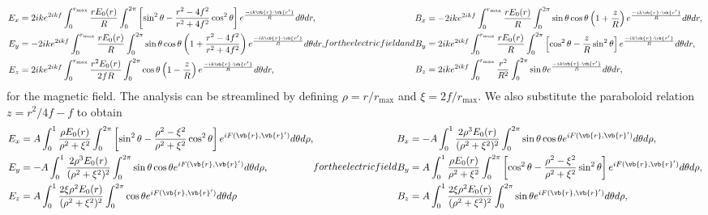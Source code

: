 \documentclass[11pt,SymmetricalJury]{inrsthesis/inrsthesis}
\begin{document}
  \begin{subequations}
  \begin{align}
    E_x      &= 2ike^{2ikf}\int_0^{r_\text{max}}\frac{rE_0(r)}{R}\int_0^{2\pi}
        \left[\sin^2\theta-\frac{r^2-4f^2}{r^2+4f^2}\cos^2\theta\right]
        e^{\frac{-ik\vb{r}\cdot\vb{r'}}{R}} d\theta dr, \\
    E_y     &= -2ike^{2ikf}\int_0^{r_\text{max}}\frac{rE_0(r)}{R}\int_0^{2\pi}
        \sin\theta\cos\theta\left(1+\frac{r^2-4f^2}{r^2+4f^2}\right)
        e^{\frac{-ik\vb{r}\cdot\vb{r'}}{R}} d\theta dr, \\
    E_z     &= 2ike^{2ikf}\int_0^{r_\text{max}}\frac{r^2E_0(r)}{2fR}\int_0^{2\pi}
        \cos\theta\left(1-\frac{z}{R}\right)
        e^{\frac{-ik\vb{r}\cdot\vb{r'}}{R}} d\theta dr,
  \end{align}
for the electric field and
  \begin{align}
    B_x       &=-2ike^{2ikf}\int_0^{r_\text{max}}\frac{rE_0(r)}{R}\int_0^{2\pi}
        \sin\theta\cos\theta\left(1+\frac{z}{R}\right)
        e^{\frac{-ik\vb{r}\cdot\vb{r'}}{R}} d\theta dr, \\
    B_y       &= 2ike^{2ikf}\int_0^{r_\text{max}}\frac{rE_0(r)}{R}\int_0^{2\pi}
        \left[\cos^2\theta-\frac{z}{R}\sin^2\theta\right]
        e^{\frac{-ik\vb{r}\cdot\vb{r'}}{R}} d\theta dr,\\
    B_z       &= 2ike^{2ikf}\int_0^{r_\text{max}}\frac{r^2}{R^2}\int_0^{2\pi}
        \sin\theta e^{\frac{-ik\vb{r}\cdot\vb{r'}}{R}} d\theta dr,
  \end{align}
  \end{subequations}
for the magnetic field. The analysis can be streamlined by defining $\rho=r/r_\text{max}$
and $\xi=2f/r_\text{max}$. We also substitute the paraboloid relation $z=r^2/4f-f$
to obtain
  \begin{subequations}
  \begin{align}
    E_x      &= A\int_0^{1}\frac{\rho E_0(r)}{\rho^2+\xi^2}\int_0^{2\pi}
        \left[\sin^2\theta-\frac{\rho^2-\xi^2}{\rho^2+\xi^2}\cos^2\theta\right]
        e^{iF(\vb{r},\vb{r}')}d\theta d\rho, \\
    E_y     &= -A\int_0^{1}\frac{2\rho^3 E_0(r)}{(\rho^2+\xi^2)^2}\int_0^{2\pi}
        \sin\theta\cos\theta
        e^{iF(\vb{r},\vb{r}')}d\theta d\rho, \\
    E_z     &= A\int_0^{1}\frac{2\xi\rho^2E_0(r)}{(\rho^2+\xi^2)^2}\int_0^{2\pi}
        \cos\theta e^{iF(\vb{r},\vb{r}')}d\theta d\rho
  \end{align}
for the electric field
  \begin{align}
    B_x       &=-A\int_0^{1}\frac{2\rho^3 E_0(r)}{(\rho^2+\xi^2)^2}\int_0^{2\pi}
        \sin\theta\cos\theta
        e^{iF(\vb{r},\vb{r}')}d\theta d\rho, \\
    B_y        &= A\int_0^{1}\frac{\rho E_0(r)}{\rho^2+\xi^2}\int_0^{2\pi}
        \left[\cos^2\theta-\frac{\rho^2-\xi^2}{\rho^2+\xi^2}\sin^2\theta\right]
        e^{iF(\vb{r},\vb{r}')}d\theta d\rho,\\
    B_z       &= A\int_0^{1}\frac{2\xi\rho^2 E_0(r)}{(\rho^2+\xi^2)^2}\int_0^{2\pi}
        \sin\theta e^{iF(\vb{r},\vb{r}')}d\theta d\rho,
  \end{align}
  \end{subequations}
\end{document}
